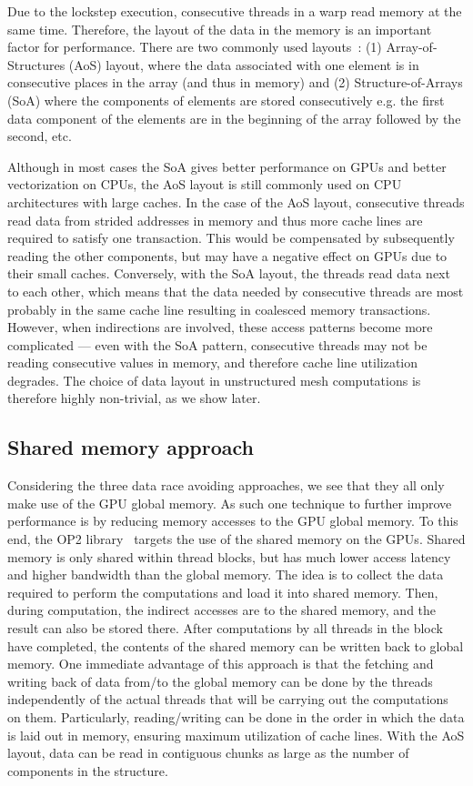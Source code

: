 \noindent Due to the lockstep execution, consecutive threads in a warp read  
memory at the same time. Therefore, the layout of the data in the memory is an 
important factor for performance. There are two commonly used 
layouts~\cite{sharma2015data}: (1) Array-of-Structures (AoS) layout, where the
data associated with one element is in consecutive places in the array (and thus
in memory) and (2) Structure-of-Arrays (SoA) where the components of elements
are stored consecutively e.g. the first data component of the elements are in
the beginning of the array followed by the second, etc.

Although in most cases the SoA gives better performance on GPUs and better
vectorization on CPUs, the AoS layout is still commonly used on CPU
architectures with large caches. In the case of the AoS layout, consecutive
threads read data from strided addresses in memory and thus more cache lines 
are required to satisfy one transaction. This would be compensated by 
subsequently reading the other components, but may have a negative effect on 
 GPUs due to their small caches. Conversely, with the SoA layout, the 
threads read data next to each other, which means that the data needed by 
consecutive threads are most probably in the same cache line resulting in 
coalesced memory transactions. However, when indirections are involved, these
access patterns become more complicated --- even with the SoA pattern,
consecutive threads may not be reading consecutive values in memory, and
therefore cache line utilization degrades. The choice of data layout in
unstructured mesh computations is therefore highly non-trivial, as we show
later.

\subsection{Shared memory approach}\label{shared-memory-approach}

\noindent Considering the three data race avoiding approaches, we see that they 
all only make use of the GPU global memory. As such one technique to further 
improve performance is by reducing memory accesses to the GPU global memory. To 
this end, the OP2 library~\cite{op2} targets the use of the shared memory on 
the GPUs. Shared memory is only shared within thread blocks, but has much lower 
access latency and higher bandwidth than the global memory. The idea is to 
collect the data required to perform the computations and load it into shared 
memory. Then, during computation, the indirect accesses are to the shared
memory, and the result can also be stored there. After computations by all 
threads in the block have completed, the contents of the shared memory can be 
written back to global memory. One immediate advantage of this approach is that 
the fetching and writing back of data from/to the global memory can be done by 
the threads independently of the actual threads that will be carrying out the 
computations on them. Particularly, reading/writing can be done in the order 
in which the data is laid out in memory, ensuring maximum utilization of 
cache lines. With the AoS layout, data can be read in contiguous chunks as 
large as the number of components in the structure.

